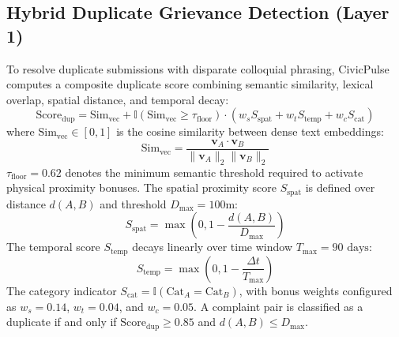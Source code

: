 \documentclass[conference]{IEEEtran}
\begin{document}
\subsection{Hybrid Duplicate Grievance Detection (Layer 1)}
To resolve duplicate submissions with disparate colloquial phrasing, CivicPulse computes a composite duplicate score combining semantic similarity, lexical overlap, spatial distance, and temporal decay:
\begin{equation}
\text{Score}_{\text{dup}} = \text{Sim}_{\text{vec}} + \mathbb{I}(\text{Sim}_{\text{vec}} \ge \tau_{\text{floor}}) \cdot \left( w_s S_{\text{spat}} + w_t S_{\text{temp}} + w_c S_{\text{cat}} \right)
\end{equation}
where $\text{Sim}_{\text{vec}} \in [0, 1]$ is the cosine similarity between dense text embeddings:
\begin{equation}
\text{Sim}_{\text{vec}} = \frac{\mathbf{v}_A \cdot \mathbf{v}_B}{\|\mathbf{v}_A\|_2 \|\mathbf{v}_B\|_2}
\end{equation}
$\tau_{\text{floor}} = 0.62$ denotes the minimum semantic threshold required to activate physical proximity bonuses. The spatial proximity score $S_{\text{spat}}$ is defined over distance $d(A, B)$ and threshold $D_{\max} = 100\text{m}$:
\begin{equation}
S_{\text{spat}} = \max\left(0, 1 - \frac{d(A, B)}{D_{\max}}\right)
\end{equation}
The temporal score $S_{\text{temp}}$ decays linearly over time window $T_{\max} = 90\text{ days}$:
\begin{equation}
S_{\text{temp}} = \max\left(0, 1 - \frac{\Delta t}{T_{\max}}\right)
\end{equation}
The category indicator $S_{\text{cat}} = \mathbb{I}(\text{Cat}_A = \text{Cat}_B)$, with bonus weights configured as $w_s = 0.14$, $w_t = 0.04$, and $w_c = 0.05$. A complaint pair is classified as a duplicate if and only if $\text{Score}_{\text{dup}} \ge 0.85$ and $d(A, B) \le D_{\max}$.
\end{document}
